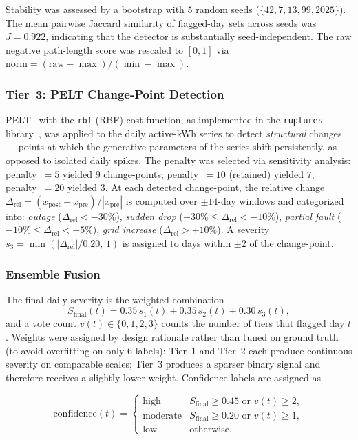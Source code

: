 \documentclass[11pt]{article}
\begin{document}
Stability was assessed by a bootstrap with $5$ random seeds ($\{42, 7, 13, 99, 2025\}$). The mean pairwise Jaccard similarity of flagged-day sets across seeds was $\overline{J}=0.922$, indicating that the detector is substantially seed-independent. The raw negative path-length score was rescaled to $[0,1]$ via
$\mathrm{norm} = (\mathrm{raw} - \max)/(\min - \max)$.

\subsubsection*{Tier~3: PELT Change-Point Detection}
PELT~\cite{killick2012pelt} with the \texttt{rbf} (RBF) cost function, as implemented in the \texttt{ruptures} library~\cite{truong2020ruptures}, was applied to the daily active-kWh series to detect \emph{structural} changes --- points at which the generative parameters of the series shift persistently, as opposed to isolated daily spikes. The penalty was selected via sensitivity analysis: penalty~$=5$ yielded $9$ change-points; penalty~$=10$ (retained) yielded $7$; penalty~$=20$ yielded $3$. At each detected change-point, the relative change
\(
\Delta_{\text{rel}} = (\overline{x}_{\text{post}} - \overline{x}_{\text{pre}})/|\overline{x}_{\text{pre}}|
\)
is computed over $\pm 14$-day windows and categorized into:
\emph{outage} ($\Delta_{\text{rel}} < -30\%$),
\emph{sudden drop} ($-30\% \leq \Delta_{\text{rel}} < -10\%$),
\emph{partial fault} ($-10\% \leq \Delta_{\text{rel}} < -5\%$),
\emph{grid increase} ($\Delta_{\text{rel}} > +10\%$).
A severity $s_3 = \min(|\Delta_{\text{rel}}|/0.20,\,1)$ is assigned to days within $\pm 2$ of the change-point.

\subsubsection*{Ensemble Fusion}
The final daily severity is the weighted combination
\[
  S_{\text{final}}(t) = 0.35\,s_1(t) + 0.35\,s_2(t) + 0.30\,s_3(t),
\]
and a vote count $v(t) \in \{0,1,2,3\}$ counts the number of tiers that flagged day $t$. Weights were assigned by design rationale rather than tuned on ground truth (to avoid overfitting on only $6$ labels): Tier~1 and Tier~2 each produce continuous severity on comparable scales; Tier~3 produces a sparser binary signal and therefore receives a slightly lower weight. Confidence labels are assigned as

\[
  \text{confidence}(t) = \begin{cases}
    \text{high}     & S_{\text{final}} \geq 0.45 \text{ or } v(t) \geq 2,\\
    \text{moderate} & S_{\text{final}} \geq 0.20 \text{ or } v(t) \geq 1,\\
    \text{low}      & \text{otherwise}.
  \end{cases}
\]
\end{document}
